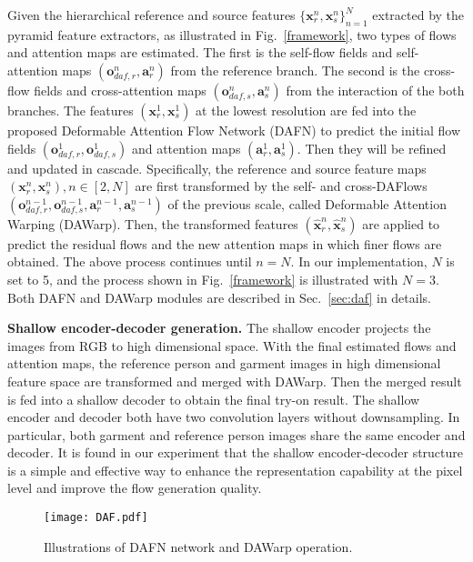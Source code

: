 \documentclass[runningheads]{llncs}
\begin{document}
Given the hierarchical reference and source features $\{\bm{x}_r^n,\bm{x}_s^n\}_{n=1}^N$ extracted by the pyramid feature extractors, as illustrated in Fig.~\ref{framework}, two types of flows and attention maps are estimated. The first is the self-flow fields and self-attention maps $(\bm{o}_{daf,r}^n,\bm{a}_r^n)$ from the reference branch. The second is the cross-flow fields and cross-attention maps $(\bm{o}_{daf,s}^n,\bm{a}_s^n)$ from the interaction of the both branches.
The features $(\bm{x}_r^1,\bm{x}_s^1)$ at the lowest resolution are fed into the proposed Deformable Attention Flow Network (DAFN) to predict the initial flow fields $(\bm{o}_{daf,r}^1, \bm{o}_{daf,s}^1)$ and attention maps $(\bm{a}_r^1, \bm{a}_s^1)$. Then they will be refined and updated in cascade. Specifically, the reference and source feature maps $(\bm{x}_r^n,\bm{x}_s^n),n \in [2,N]$ are first transformed 
by the self- and cross-DAFlows  $(\bm{o}_{daf,r}^{n-1}, \bm{o}_{daf,s}^{n-1}, \bm{a}_r^{n-1}, \bm{a}_s^{n-1})$ of the previous scale, called Deformable Attention Warping (DAWarp). Then, the transformed features $(\hat{\bm{x}}_r^n,\hat{\bm{x}}_s^n)$ are applied to predict the residual flows and the new attention maps in which finer flows are obtained. The above process continues until $n = N$. In our implementation, $N$ is set to 5, and the process shown in Fig.~\ref{framework} is illustrated with $N =3$. Both DAFN and DAWarp modules are described in Sec.~\ref{sec:daf} in details.

\textbf{Shallow encoder-decoder generation.} The shallow encoder projects the images from RGB to high dimensional space. With the final estimated flows and attention maps, the reference person and garment images in high dimensional feature space are transformed and merged with DAWarp. Then the merged result is fed into a shallow decoder to obtain the final try-on result. The shallow encoder and decoder both have two convolution layers without downsampling. In particular, both garment and reference person images share the same encoder and decoder. It is found in our experiment that the shallow encoder-decoder structure is a simple and effective way to enhance the representation capability at the pixel level and improve the flow generation quality.



\begin{figure}[t]
\centering
\texttt{[image: DAF.pdf]}
   \caption{Illustrations of DAFN network and DAWarp operation.
   \label{DAF}}

\end{figure}
\end{document}
